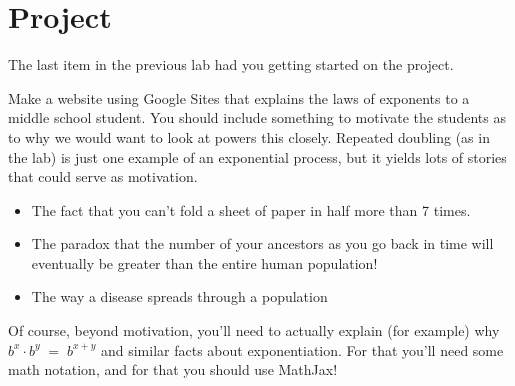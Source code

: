 \section{Project}

The last item in the previous lab had you getting started on the project.

Make a website using Google Sites that explains the laws of exponents to a middle school student.
You should include something to motivate the students as to why we would want to look at powers this closely.  Repeated doubling (as in the lab) is just one example of an exponential process, but it yields lots of stories that could serve as motivation.  

\begin{itemize}
\item The fact that you can't fold a sheet of paper in half more than 7 times.
\item The paradox that the number of your ancestors as you go back in time will eventually be greater than the entire human population! 
\item The way a disease spreads through a population
\end{itemize}

Of course, beyond motivation, you'll need to actually explain (for example) why $b^x \cdot b^y \; = \; b^{x+y}$ and similar facts about exponentiation.  For that you'll need some math notation, and for that you should use MathJax!
